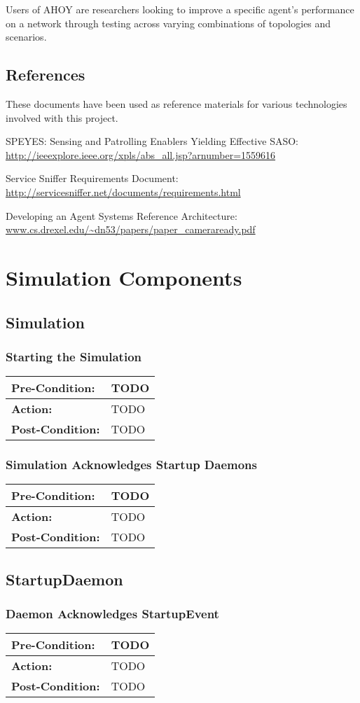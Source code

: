 \documentclass[titlepage]{article}
\renewenvironment{itemize*}
    {\begin{itemize}
        \setlength{\itemsep}{0pt}%
        \setlength{\parskip}{0pt}%
        \setlength{\partopsep}{0pt}%
        \setlength{\topsep}{0pt}}%
    {\end{itemize}}
\newcommand{\testcase}[3]{
    \begin{center}
    \begin{tabular}{| l | p{0.7\textwidth}|}
        \hline
        \rowcolor[gray]{0.8}\textbf{Pre-Condition:} & #1 \\ \hline
        \textbf{Action:} & #2 \\ \hline
        \rowcolor[gray]{0.8}\textbf{Post-Condition:} & #3 \\ \hline
    \end{tabular}
    \end{center}
}
\begin{document}
Users of AHOY are researchers looking to improve a specific agent's performance on a network through testing across varying combinations of topologies and scenarios.

\subsection{References%
  \label{references}%
}

These documents have been used as reference materials for various technologies involved with this project.
%
\begin{itemize*}
	\item SPEYES: Sensing and Patrolling Enablers Yielding Effective SASO: \url{http://ieeexplore.ieee.org/xpls/abs_all.jsp?arnumber=1559616}
	\item Service Sniffer Requirements Document: \url{http://servicesniffer.net/documents/requirements.html}
    \item Developing an Agent Systems Reference Architecture: \url{www.cs.drexel.edu/~dn53/papers/paper_cameraready.pdf}
\end{itemize*}

\section{Simulation Components}
\subsection{Simulation}
\subsubsection{Starting the Simulation}

\testcase{TODO}{TODO}{TODO}

\subsubsection{Simulation Acknowledges Startup Daemons}

\testcase{TODO}{TODO}{TODO}

\subsection{StartupDaemon}
\subsubsection{Daemon Acknowledges StartupEvent}
\testcase{TODO}{TODO}{TODO}
\end{document}
